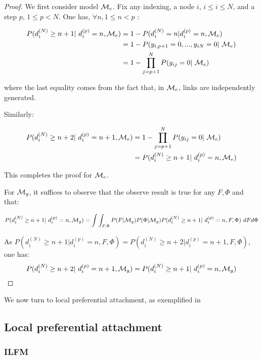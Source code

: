 \begin{proof}
We first consider model $\mathcal{M}_e$. Fix any indexing, a node $i$, $i \leq i \leq N$, and a step $p$, $1 \leq p < N$. One has, $\forall n, 1 \leq n < p$ :

\begin{align*}
P(d_i^{(N)} \geq n+1 | d_i^{(p)}=n, \M_e) &= 1 - P(d_i^{(N)}=n | d_i^{(p)}=n, \M_e) \\
        &= 1 -P(y_{i,p+1}=0, ...,y_{iN}=0 | \M_e ) \\
        &= 1 - \prod_{j=p+1}^N P(y_{ij}=0 | \M_e)
\end{align*}

where the last equality comes from the fact that, in $\mathcal{M}_e$, links are independently generated.

Similarly:

\begin{align*}
P(d_i^{(N)} \geq n+2 | d_i^{(p)}=n+1, \M_e) &= 1 - \prod_{j=p+1}^N P(y_{ij}=0 | \M_e) \\
                    &=P(d_i^{(N)} \geq n+1 | d_i^{(p)}=n, \M_e)
\end{align*}

This completes the proof for $\mathcal{M}_e$.

For $\mathcal{M}_g$, it suffices to observe that the observe result is true for any $F, \Phi$ and that:

\begin{equation*}
P(d_i^{(N)} \geq n+1 | d_i^{(p)}=n, \M_g)  = \int\int_{F,\Phi} P(F|\M_g)P(\Phi|\M_g) P(d_i^{(N)} \geq n+1 | d_i^{(p)}=n, F, \Phi) \ dF d\Phi
\end{equation*}

As $P(d_i^{(N)} \geq n+1 | d_i^{(p)}=n, F, \Phi) = P(d_i^{(N)} \geq n+2 | d_i^{(p)}=n+1, F, \Phi)$, one has:
\begin{equation*}
P(d_i^{(N)} \geq n+2 | d_i^{(p)}=n+1, \M_g) = P(d_i^{(N)} \geq n+1 | d_i^{(p)}=n, \M_g)
\end{equation*}

\end{proof}


We now turn to local preferential attachment, as exemplified in \cite{LeskovecBKT08}


\subsection{Local preferential attachment}

\subsubsection{ILFM}

